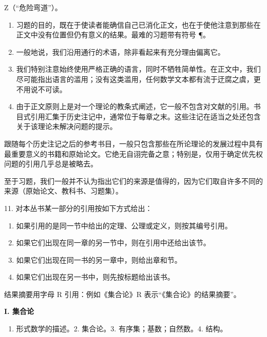 Z（“危险弯道”）。

\begin{enumerate}
\def\labelenumi{\arabic{enumi}.}
\setcounter{enumi}{6}
\item
  习题的目的，既在于使读者能确信自己已消化正文，也在于使他注意到那些在正文中没有位置但仍有意义的结果。最难的习题带有符号 ¶。
\item
  一般地说，我们沿用通行的术语，除非看起来有充分理由偏离它。
\item
  我们特别注意始终使用严格正确的语言，同时不牺牲简单性。在正文中，我们尽可能指出语言的滥用；没有这类滥用，任何数学文本都有流于迂腐之虞，更不用说不可读。
\item
  由于正文原则上是对一个理论的教条式阐述，它一般不包含对文献的引用。书目式引用汇集于历史注记中，通常位于每章之末。这些注记在适当之处还包含关于该理论未解决问题的提示。
\end{enumerate}

跟随每个历史注记之后的参考书目，一般只包含那些在所论理论的发展过程中具有最重要意义的书籍和原始论文。它绝无自诩完备之意；特别是，仅用于确定优先权问题的引用几乎总是被略去。

至于习题，我们一般并不认为指出它们的来源是值得的，因为它们取自许多不同的来源（原始论文、教科书、习题集）。

11. 对本丛书某一部分的引用按如下方式给出：\par

\begin{enumerate}
\def\labelenumi{\alph{enumi})}
\item
  如果引用的是同一节中给出的定理、公理或定义，则按其编号引用。
\item
  如果它们出现在同一章的另一节中，则在引用中还给出该节。
\item
  如果它们出现在同一书的另一章中，则给出章和节。
\item
  如果它们出现在另一书中，则先按标题给出该书。
\end{enumerate}

结果摘要用字母 R 引用：例如《集合论》R 表示“《集合论》的结果摘要”。


\textbf{I. 集合论}\par

\begin{enumerate}
\def\labelenumi{\arabic{enumi}.}
\tightlist
\item
  形式数学的描述。2. 集合论。3. 有序集；基数；自然数。4. 结构。
\end{enumerate}

